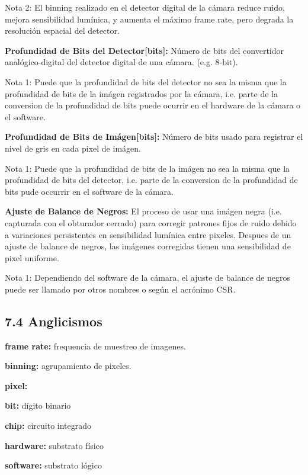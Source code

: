 \documentclass{article}
\begin{document}
Nota 2: El binning realizado en el detector digital de la c\'amara reduce ruido, mejora sensibilidad lum\'inica, y aumenta el m\'aximo frame rate, pero degrada la resoluci\'on espacial del detector.

\noindent\textbf{Profundidad de Bits del Detector[bits]:} N\'umero de bits del convertidor anal\'ogico-digital del detector digital de una c\'amara. (e.g. 8-bit).

Nota 1: Puede que la profundidad de bits del detector no sea la misma que la profundidad de bits de la im\'agen registrados por la c\'amara, i.e. parte de la conversion de la profundidad de bits puede ocurrir en el hardware de la c\'amara o el software.

\noindent\textbf{Profundidad de Bits de Im\'agen[bits]:} N\'umero de bits usado para registrar el nivel de gris en cada pixel de im\'agen.

Nota 1: Puede que la profundidad de bits de la im\'agen no sea la misma que la profundidad de bits del detector, i.e. parte de la conversion de la profundidad de bits pude occurrir en el software de la c\'amara.

\noindent\textbf{Ajuste de Balance de Negros:} El proceso de usar una im\'agen negra (i.e. capturada con el obturador cerrado) para corregir patrones fijos de ruido debido a variaciones persistentes en sensibilidad lum\'inica entre pixeles. Despues de un ajuste de balance de negros, las im\'agenes corregidas tienen una sensibilidad de pixel uniforme.

Nota 1: Dependiendo del software de la c\'amara, el ajuste de balance de negros puede ser llamado por otros nombres o seg\'un el acr\'onimo CSR.


\subsection*{7.4 Anglicismos}

\noindent\textbf{frame rate:} frequencia de muestreo de imagenes.

\noindent\textbf{binning:} agrupamiento de pixeles.

\noindent\textbf{pixel:} 

\noindent\textbf{bit:} d\'igito binario

\noindent\textbf{chip:} circuito integrado

\noindent\textbf{hardware:} substrato f\'isico

\noindent\textbf{software:} substrato l\'ogico
\end{document}

